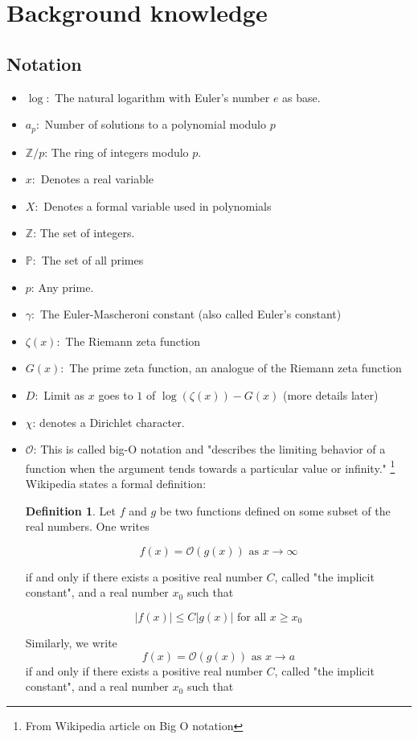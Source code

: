 \documentclass{article}
\theoremstyle{definition}
\newtheorem{definition}{Definition}[section]
\theoremstyle{remark}
\begin{document}
\section{Background knowledge}
\subsection{Notation}
\begin{itemize}
\item $\log:$ The natural logarithm with Euler's number $e$ as base.
\item $a_p:$ Number of solutions to a polynomial modulo $p$
\item $\mathbb{Z}/p$: The ring of integers modulo $p$.
\item $x:$ Denotes a real variable
\item $X:$ Denotes a formal variable used in polynomials
\item $\mathbb{Z}$: The set of integers.
\item $\mathbb{P}:$ The set of all primes
\item $p$: Any prime.
\item $\gamma:$ The Euler-Mascheroni constant (also called Euler's constant)
\item $\zeta(x):$ The Riemann zeta function
\item $G(x):$ The prime zeta function, an analogue of the Riemann zeta function
\item $D:$ Limit as $x$ goes to $1$ of $\log(\zeta(x))-G(x)$ (more details later)
\item $\chi$: denotes a Dirichlet character.
\item $\mathcal{O}$: This is called big-O notation and "describes the limiting behavior of a function when the argument tends towards a particular value or infinity." \footnote{From Wikipedia article on Big O notation} Wikipedia states a formal definition:
\begin{definition}
Let $f$ and $g$ be two functions defined on some subset of the real numbers. One writes

$$f(x)=\mathcal{O}(g(x))\text{ as }x\to\infty$$

if and only if there exists a positive real number $C$, called "the implicit constant", and a real number $x_0$ such that

$$|f(x)| \leq  C |g(x)|\text{ for all }x \geq x_0$$

Similarly, we write
$$f(x)=\mathcal{O}(g(x)) \text{ as }x \to a$$
if and only if there exists a positive real number $C$, called "the implicit constant", and a real number $x_0$ such that


\end{definition}
\end{itemize}
\end{document}
